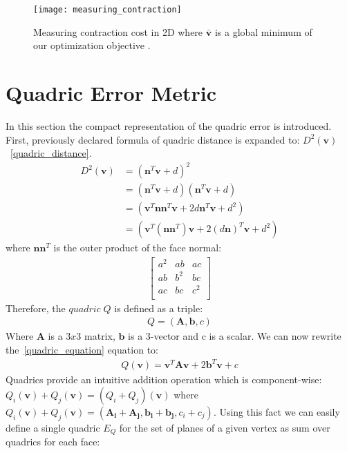 \begin{figure}[H]
  \begin{center}
    \texttt{[image: measuring\_contraction]}
    \caption{Measuring contraction cost in 2D where $\bar{\mathbf{v}}$ is a global minimum of our optimization objective \cite{garland99}.}
    \label{fig:measuring_contraction_ref}
  \end{center}
\end{figure}

\section{Quadric Error Metric}

In this section the compact representation of the quadric error is introduced. First, previously declared formula of quadric distance is expanded to: $D^2(\mathbf{v})$~\ref{quadric_distance}.
\begin{align}
D^2(\mathbf{v})&=(\mathbf{n}^T\mathbf{v}+d)^2\\
	  &=(\mathbf{n}^T\mathbf{v}+d)(\mathbf{n}^T\mathbf{v}+d)\\
	  &=(\mathbf{v}^T\mathbf{n}\mathbf{n}^T\mathbf{v}+2d\mathbf{n}^T\mathbf{v}+d^2)\\
	  &=(\mathbf{v}^T(\mathbf{n}\mathbf{n}^T)\mathbf{v}+2(d\mathbf{n})^T\mathbf{v}+d^2)
	  \label{quadric_equation}
\end{align}
where $\mathbf{n}\mathbf{n}^T$ is the outer product of the face normal:
\begin{align}
\left[
\begin{array}{rrrr}
a^2 & ab & ac   \\
ab  & b^2 & bc  \\
ac  & bc  & c^2 \\
\end{array}\right]
\end{align}
Therefore, the $quadric\;Q$ is defined as a triple:
\begin{align}
Q = (\mathbf{A},\mathbf{b},c)
\end{align}
Where $\mathbf{A}$ is a $3x3$ matrix, $\mathbf{b}$ is a 3-vector and c is a scalar. We can now rewrite the~\ref{quadric_equation} equation to:
\begin{align}
Q(\mathbf{v}) = \mathbf{v}^T\mathbf{A}\mathbf{v} + 2\mathbf{b}^T\mathbf{v} + c
\end{align}
Quadrics provide an intuitive addition operation which is component-wise: $Q_i(\mathbf{v}) + Q_j(\mathbf{v}) = (Q_i + Q_j)(\mathbf{v})$ where $Q_i(\mathbf{v}) + Q_j(\mathbf{v}) = (\mathbf{A_i} + \mathbf{A_j}, \mathbf{b_i} + \mathbf{b_j}, c_i + c_j)$. Using this fact we can easily define a single quadric $E_Q$ for the set of planes of a given vertex \cite{garland99} as sum over quadrics for each face:

